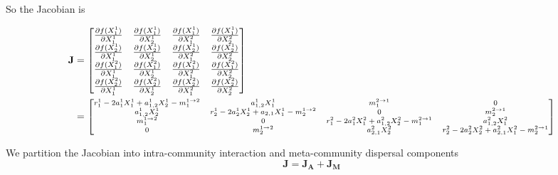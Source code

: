 \documentclass[12pt]{article}
\begin{document}
So the Jacobian is 

\begin{align*}
\mathbf{J} &= \begin{bmatrix}
    \frac{\partial f(X_1^1)}{\partial X_1^1} & \frac{\partial f(X_1^1)}{\partial X_2^1} & \frac{\partial f(X_1^1)}{\partial X_1^2} & \frac{\partial f(X_1^1)}{\partial X_2^2}\\ 
        \frac{\partial f(X_2^1)}{\partial X_1^1} & \frac{\partial f(X_2^1)}{\partial X_2^1} & \frac{\partial f(X_2^1)}{\partial X_1^2} & \frac{\partial f(X_2^1)}{\partial X_2^2}\\ 
            \frac{\partial f(X_1^2)}{\partial X_1^1} & \frac{\partial f(X_1^2)}{\partial X_2^1} & \frac{\partial f(X_1^2)}{\partial X_1^2} & \frac{\partial f(X_1^2)}{\partial X_2^2}\\ 
                \frac{\partial f(X_2^2)}{\partial X_1^1} & \frac{\partial f(X_2^2)}{\partial X_2^1} & \frac{\partial f(X_2^2)}{\partial X_1^2} & \frac{\partial f(X_2^2)}{\partial X_2^2} \\    
\end{bmatrix} \\
 &= \scriptsize{\begin{bmatrix}
    r_1^1 - 2a_1^1X_1^1 + a_{1,2}^1X_2^1 - m_1^{1\rightarrow 2} &  a_{1,2}^1 X_1^1 & m_1^{2\rightarrow 1} & 0 \\ 
    a_{1,2}^1X_2^1 & r_2^1 - 2a_2^1X_2^1 + a_{2,1}X_1^1 - m_2^{1\rightarrow 2} & 0 & m_2^{2\rightarrow 1} \\
    m_1^{1\rightarrow 2} & 0 & r_1^2 -2a_1^2X_1^2 + a_{1,2}^2X_2^2  - m_1^{2\rightarrow 1}& a_{1,2}^2X_1^2 \\
    0 & m_2^{1\rightarrow 2} & a_{2,1}^2X_2^2 & r_2^2 - 2a_2^2X_2^2 + a_{2,1}^2X_1^2-m_2^{2\rightarrow 1}\\       
\end{bmatrix} }
\end{align*}

We partition the Jacobian into intra-community interaction and meta-community dispersal components
\[ \mathbf{J} = \mathbf{J_A} + \mathbf{J_M} \]
\end{document}
